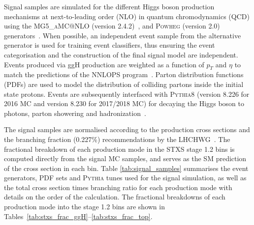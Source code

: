 Signal samples are simulated for the different Higgs boson production mechanisms at next-to-leading order (NLO) in quantum chromodynamics (QCD) using the \textsc{MG5\_aMC@NLO} (version 2.4.2)~\cite{}, and \textsc{Powheg} (version 2.0) generators~\cite{}. When possible, an independent event sample from the alternative generator is used for training event classifiers, thus ensuring the event categorisation and the construction of the final signal model are independent. Events produced via ggH production are weighted as a function of $p_T$ and $\eta$ to match the predictions of the NNLOPS program~\cite{}. Parton distribution functions (PDFs) are used to model the distribution of colliding partons inside the initial state protons. Events are subsequently interfaced with \textsc{Pythia8} (version 8.226 for 2016 MC and version 8.230 for 2017/2018 MC) for decaying the Higgs boson to photons, parton showering and hadronization~\cite{}. 

The signal samples are normalised according to the production cross sections and the \Hgg branching fraction (0.227\%) recommendations by the LHCHWG~\cite{}. The fractional breakdown of each production mode in the STXS stage 1.2 bins is computed directly from the signal MC samples, and serves as the SM prediction of the cross section in each bin. Table \ref{tab:signal_samples} summarises the event generators, PDF sets and \textsc{Pythia} tunes used for the signal simulation, as well as the total cross section times branching ratio for each production mode with details on the order of the calculation. The fractional breakdowns of each production mode into the stage 1.2 bins are shown in Tables~\ref{tab:stxs_frac_ggH}--\ref{tab:stxs_frac_top}.

